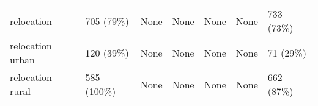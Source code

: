\begin{tabular}{lllllll}
relocation                    &                           705 (79\%) &                     None &         None &           None &         None &                           733 (73\%) \\
relocation urban              &                           120 (39\%) &                     None &         None &           None &         None &                            71 (29\%) \\
relocation rural              &                          585 (100\%) &                     None &         None &           None &         None &                           662 (87\%) \\
\bottomrule
\end{tabular}
